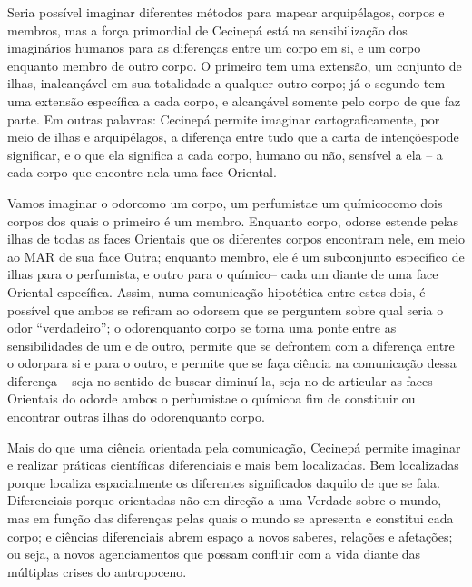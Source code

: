 Seria possível imaginar diferentes métodos para mapear arquipélagos, corpos e membros, mas a força primordial de Cecinepá está na sensibilização dos imaginários humanos para as diferenças entre um corpo em si, e um corpo enquanto membro de outro corpo. O primeiro tem uma extensão, um conjunto de ilhas, inalcançável em sua totalidade a qualquer outro corpo; já o segundo tem uma extensão específica a cada corpo, e alcançável somente pelo corpo de que faz parte. Em outras palavras: Cecinepá permite imaginar cartograficamente, por meio de ilhas e arquipélagos, a diferença entre tudo que a \guillemetleft carta de intenções\guillemetright pode significar, e o que ela significa a cada corpo, humano ou não, sensível a ela -- a cada corpo que encontre nela uma face Oriental.

Vamos imaginar o \guillemetleft odor\guillemetright como um corpo, um \guillemetleft perfumista\guillemetright e um \guillemetleft químico\guillemetright como dois corpos dos quais o primeiro é um membro. Enquanto corpo, \guillemetleft odor\guillemetright se estende pelas ilhas de todas as faces Orientais que os diferentes corpos encontram nele, em meio ao MAR de sua face Outra; enquanto membro, ele é um subconjunto específico de ilhas para o \guillemetleft perfumista\guillemetright, e outro para o \guillemetleft químico\guillemetright -- cada um diante de uma face Oriental específica. Assim, numa comunicação hipotética entre estes dois, é possível que ambos se refiram ao \guillemetleft odor\guillemetright sem que se perguntem sobre qual seria o odor \enquote{verdadeiro}; o \guillemetleft odor\guillemetright enquanto corpo se torna uma ponte entre as sensibilidades de um e de outro, permite que se defrontem com a diferença entre o \guillemetleft odor\guillemetright para si e para o outro, e permite que se faça ciência na comunicação dessa diferença -- seja no sentido de buscar diminuí-la, seja no de articular as faces Orientais do \guillemetleft odor\guillemetright de ambos o \guillemetleft perfumista\guillemetright e o \guillemetleft químico\guillemetright a fim de constituir ou encontrar outras ilhas do \guillemetleft odor\guillemetright enquanto corpo.

Mais do que uma ciência orientada pela comunicação, Cecinepá permite imaginar e realizar práticas científicas diferenciais e mais bem localizadas. Bem localizadas porque localiza espacialmente os diferentes significados daquilo de que se fala. Diferenciais porque orientadas não em direção a uma Verdade sobre o mundo, mas em função das diferenças pelas quais o mundo se apresenta e constitui cada corpo; e ciências diferenciais abrem espaço a novos saberes, relações e afetações; ou seja, a novos agenciamentos que possam confluir com a vida diante das múltiplas crises do antropoceno.

